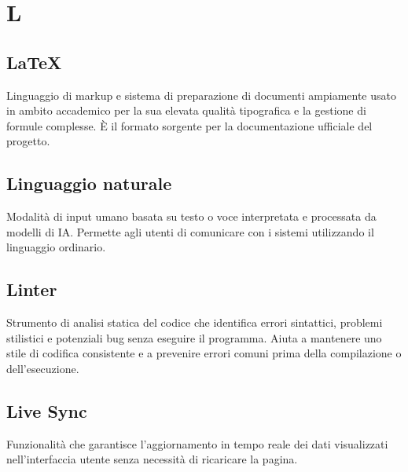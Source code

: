\documentclass[a4paper, 11pt, oneside]{scrartcl} %
\begin{document}

\section*{L}


\subsection*{LaTeX}


Linguaggio di markup e sistema di preparazione di documenti ampiamente usato in ambito accademico per la sua elevata qualità tipografica e la gestione di formule complesse. È il formato sorgente per la documentazione ufficiale del progetto.

\vspace{0.5cm}

\subsection*{Linguaggio naturale}


Modalità di input umano basata su testo o voce interpretata e processata da modelli di IA. Permette agli utenti di comunicare con i sistemi utilizzando il linguaggio ordinario.

\vspace{0.5cm}

\subsection*{Linter}
Strumento di analisi statica del codice che identifica errori sintattici, problemi stilistici e potenziali bug senza eseguire il programma. Aiuta a mantenere uno stile di codifica consistente e a prevenire errori comuni prima della compilazione o dell'esecuzione.
\vspace{0.5cm}

\subsection*{Live Sync}
Funzionalità che garantisce l'aggiornamento in tempo reale dei dati visualizzati nell'interfaccia utente senza necessità di ricaricare la pagina.
\vspace{0.5cm}
\end{document}
